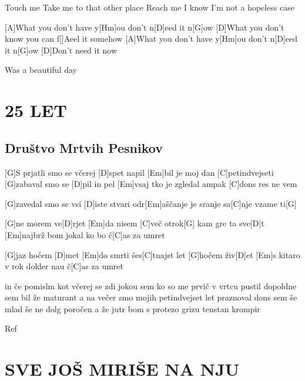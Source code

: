 \documentclass{article}
\begin{document}
\begin{multicols}{2}
\begin{guitar}
	Touch me
	Take me to that other place
	Reach me
	I know I'm not a hopeless case

	[A]What you don't have y[Hm]ou don't n[D]eed it n[G]ow
	[D]What you don't know you can f[]Aeel it somehow
	[A]What you don't have y[Hm]ou don't n[D]eed it n[G]ow
	[D]Don't need it now

	Was a beautiful day 


\end{guitar}

\section*{25 LET}
%
\subsection*{Društvo Mrtvih Pesnikov}
\begin{guitar}

	[G]S prjatli smo se včerej [D]spet napil
	[Em]bil je moj dan [C]petindvejseti
	[G]zabaval smo se [D]pil in pel
	[Em]vsaj tko je zgledal ampak [C]dons res ne vem
	\linebreak

	[G]zavedal smo se vsi [D]iste stvari
	odr[Em]aščanje je sranje sa[C]nje vzame ti[G]
	\linebreak

	[G]ne morem ve[D]rjet
	[Em]da nisem [C]več otrok[G]
	kam gre ta sve[D]t
	[Em]najbrž bom jokal ko bo č[C]as za umret
	\linebreak

	[G]jaz hočem [D]met
	[Em]do smrti šes[C]tnajst let
	[G]hočem živ[D]et
	[Em]s kitaro v rok dokler nau č[C]as za umret
	\linebreak

	in če pomislm kot včerej se zdi
	jokou sem ko so me prvič v vrtcu pustil
	dopoldne sem bil že maturant
	a na večer smo mojih petindvejset let praznoval
	dons sem še mlad še ne dolg poročen
	a že jutr bom s protezo grizu tenstan krompir
	\linebreak
		
	Ref

\end{guitar}


\section*{SVE JOŠ MIRIŠE NA NJU}
%

\end{multicols}
\end{document}
